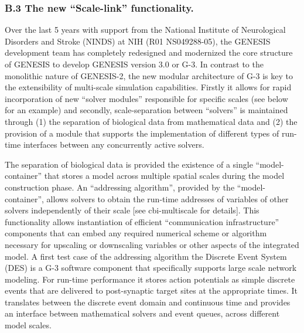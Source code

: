 \documentclass[12pt]{article}
\begin{document}
\subsubsection*{B.3 The new ``Scale-link'' functionality.}

\noindent Over the last 5 years with support from the National
Institute of Neurological Disorders and Stroke (NINDS) at NIH (R01
NS049288-05), the GENESIS development team has completely redesigned
and modernized the core structure of GENESIS to develop GENESIS
version 3.0 or G-3.  In contrast to the monolithic nature of
GENESIS-2, the new modular architecture of G-3 is key to the
extensibility of multi-scale simulation capabilities.  Firstly it
allows for rapid incorporation of new ``solver modules'' responsible
for specific scales (see below for an example) and secondly,
scale-separation between ``solvers'' is maintained through (1) the
separation of biological data from mathematical data and (2) the
provision of a module that supports the implementation of different
types of run-time interfaces between any concurrently active solvers.

The separation of biological data is provided the existence of a
single ``model-container'' that stores a model across multiple spatial
scales during the model construction phase.  An ``addressing
algorithm'', provided by the ``model-container'', allows solvers to
obtain the run-time addresses of variables of other solvers
independently of their scale [see cbi-multiscale for details].  This
functionality allows instantiation of efficient ``communication
infrastructure'' components that can embed any required numerical
scheme or algorithm necessary for upscaling or downscaling variables
or other aspects of the integrated model.
A first test case of the addressing algorithm the Discrete Event
System (DES) is a G-3 software component that specifically supports
large scale network modeling.  For run-time performance it stores
action potentials as simple discrete events that are delivered to
post-synaptic target sites at the appropriate times.  It translates
between the discrete event domain and continuous time and provides an
interface between mathematical solvers and event queues, across
different model scales.

\end{document}
